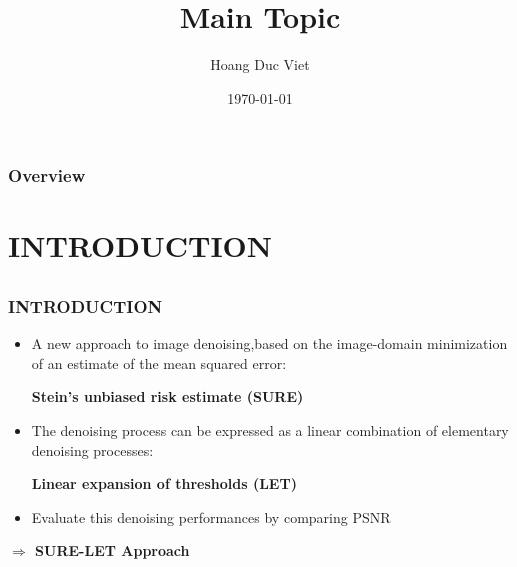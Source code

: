 \documentclass{beamer}
\title[SURE-LET APPROACH]{Main Topic } %
\author{Hoang Duc Viet} %
\institute[USTH] %
{
	ICT Lab \\ %
	\medskip
	\textit{viethdweb@gmail.com} %
}
\date{\today} %
\begin{document}
	
	\begin{frame}
		\titlepage %
	\end{frame}
	
	\begin{frame}
		\frametitle{Overview} %
		\tableofcontents %
	\end{frame}
	
	
	\section{INTRODUCTION} %
	
	\subsection{} %
	
	\begin{frame}
		\frametitle{INTRODUCTION}
		\begin{itemize}
	\item A new approach to image denoising,based on the image-domain minimization of an estimate of the
		mean squared error:
		
	\textbf{Stein's unbiased risk estimate (SURE)}
		\item The denoising process can
		be expressed as a linear combination of elementary denoising
		processes: 
		
	\textbf{Linear expansion of thresholds (LET)}
		\item  Evaluate this denoising performances by comparing PSNR
	\end{itemize}
	
\textbf{$\Rightarrow$ SURE-LET Approach}
\end{frame}
	
\end{document}
